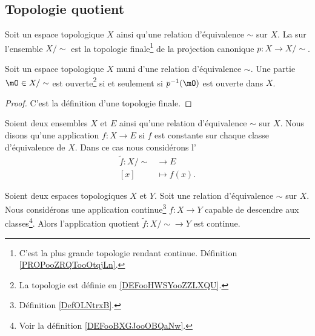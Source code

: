 \subsection{Topologie quotient}

\begin{definition}        \label{DEFooHWSYooZZLXQU}
	Soit un espace topologique \( X\) ainsi qu'une relation d'équivalence \( \sim\) sur \( X\). La  sur l'ensemble \( X/\sim\) est la topologie finale\footnote{C'est la plus grande topologie rendant continue. Définition \ref{PROPooZRQTooOtqjLn}.} de la projection canonique \(p \colon X\to X/\sim  \).
\end{definition}

\begin{proposition}     \label{PROPooDRPLooONCwYs}
	Soit un espace topologique \( X\) muni d'une relation d'équivalence \( \sim\). Une partie \( \mO\in X/\sim\) est ouverte\footnote{La topologie est définie en \ref{DEFooHWSYooZZLXQU}.} si et seulement si \( p^{-1}(\mO)\) est ouverte dans \( X\).
\end{proposition}

\begin{proof}
	C'est la définition d'une topologie finale.
\end{proof}


\begin{definition}       \label{DEFooBXGJooOBQaNw}
	Soient deux ensembles \( X\) et \( E\) ainsi qu'une relation d'équivalence \( \sim\) sur \( X\). Nous disons qu'une application \( f\colon X\to E\)  si \( f\) est constante sur chaque classe d'équivalence de \( X\). Dans ce cas nous considérons l'
	\begin{equation}
		\begin{aligned}
			\tilde f\colon X/\sim & \to E         \\
			[x]                   & \mapsto f(x).
		\end{aligned}
	\end{equation}
\end{definition}

\begin{lemma}     \label{LEMooKTINooKDjNeX}
	Soient deux espaces topologiques \( X\) et \( Y\). Soit une relation d'équivalence \( \sim\) sur \( X\). Nous considérons une application continue\footnote{Définition \ref{DefOLNtrxB}.} \( f\colon X\to Y\) capable de descendre aux classes\footnote{Voir la définition \ref{DEFooBXGJooOBQaNw}.}. Alors l'application quotient \( \tilde f\colon X/\sim\to Y\) est continue.
\end{lemma}

